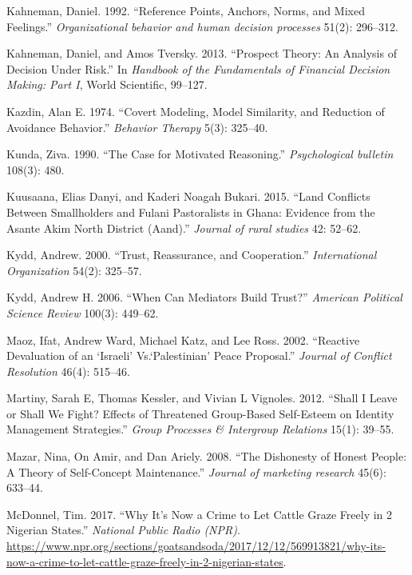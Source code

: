 \documentclass[11pt]{article}
\begin{document}
\leavevmode\hypertarget{ref-kahneman1992reference}{}%
Kahneman, Daniel. 1992. ``Reference Points, Anchors, Norms, and Mixed
Feelings.'' \emph{Organizational behavior and human decision processes}
51(2): 296--312.

\leavevmode\hypertarget{ref-kahneman2013prospect}{}%
Kahneman, Daniel, and Amos Tversky. 2013. ``Prospect Theory: An Analysis
of Decision Under Risk.'' In \emph{Handbook of the Fundamentals of
Financial Decision Making: Part I}, World Scientific, 99--127.

\leavevmode\hypertarget{ref-kazdin1974covertModeling}{}%
Kazdin, Alan E. 1974. ``Covert Modeling, Model Similarity, and Reduction
of Avoidance Behavior.'' \emph{Behavior Therapy} 5(3): 325--40.

\leavevmode\hypertarget{ref-kunda1990motivatedReasoning}{}%
Kunda, Ziva. 1990. ``The Case for Motivated Reasoning.''
\emph{Psychological bulletin} 108(3): 480.

\leavevmode\hypertarget{ref-kuusaana2015land}{}%
Kuusaana, Elias Danyi, and Kaderi Noagah Bukari. 2015. ``Land Conflicts
Between Smallholders and Fulani Pastoralists in Ghana: Evidence from the
Asante Akim North District (Aand).'' \emph{Journal of rural studies} 42:
52--62.

\leavevmode\hypertarget{ref-kydd2000trust}{}%
Kydd, Andrew. 2000. ``Trust, Reassurance, and Cooperation.''
\emph{International Organization} 54(2): 325--57.

\leavevmode\hypertarget{ref-kydd2006can}{}%
Kydd, Andrew H. 2006. ``When Can Mediators Build Trust?'' \emph{American
Political Science Review} 100(3): 449--62.

\leavevmode\hypertarget{ref-maoz2002reactive}{}%
Maoz, Ifat, Andrew Ward, Michael Katz, and Lee Ross. 2002. ``Reactive
Devaluation of an `Israeli' Vs.`Palestinian' Peace Proposal.''
\emph{Journal of Conflict Resolution} 46(4): 515--46.

\leavevmode\hypertarget{ref-martiny2012shall}{}%
Martiny, Sarah E, Thomas Kessler, and Vivian L Vignoles. 2012. ``Shall I
Leave or Shall We Fight? Effects of Threatened Group-Based Self-Esteem
on Identity Management Strategies.'' \emph{Group Processes \& Intergroup
Relations} 15(1): 39--55.

\leavevmode\hypertarget{ref-mazar2008dishonesty}{}%
Mazar, Nina, On Amir, and Dan Ariely. 2008. ``The Dishonesty of Honest
People: A Theory of Self-Concept Maintenance.'' \emph{Journal of
marketing research} 45(6): 633--44.

\leavevmode\hypertarget{ref-mcdonnel2017graze}{}%
McDonnel, Tim. 2017. ``Why It's Now a Crime to Let Cattle Graze Freely
in 2 Nigerian States.'' \emph{National Public Radio (NPR)}.
\url{https://www.npr.org/sections/goatsandsoda/2017/12/12/569913821/why-its-now-a-crime-to-let-cattle-graze-freely-in-2-nigerian-states}.
\end{document}

